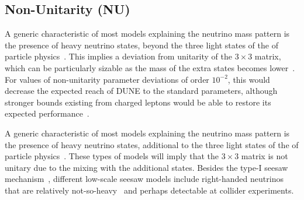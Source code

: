 \subsection{Non-Unitarity (NU)}
A generic characteristic of most models explaining the neutrino mass
pattern is the presence of heavy neutrino states, beyond the
three light states of the   of particle
physics~\cite{Minkowski:1977sc,Mohapatra:1979ia,Yanagida:1979as,GellMann:1980vs}. This implies a deviation from unitarity of the $3\times3$  matrix, which can be particularly sizable %
as the mass of the extra states becomes lower~\cite{Mohapatra:1986bd,Akhmedov:1995vm,Akhmedov:1995ip,Malinsky:2005bi}.
For values of non-unitarity parameter deviations of order $10^{-2}$, this would decrease the expected reach of DUNE to the standard parameters, although stronger bounds existing from charged leptons would be able to restore its expected performance~\cite{Blennow:2016jkn,Escrihuela:2016ube}.

A generic characteristic of most models explaining the neutrino mass
pattern is the presence of heavy neutrino states, additional to the
three light states of the   of particle
physics~\cite{Mohapatra:1998rq,Valle:2015pba,Fukugita:2003en}. These
types of models will imply that the $3 \times 3$  matrix is not
unitary due to the mixing with the additional states.  Besides the
type-I seesaw
mechanism~\cite{GellMann:1980vs,Yanagida:1979as,Mohapatra:1979ia,Schechter:1980gr},
different low-scale seesaw models include right-handed neutrinos that
are relatively not-so-heavy~\cite{Mohapatra:1986bd} and perhaps
detectable at collider experiments.

